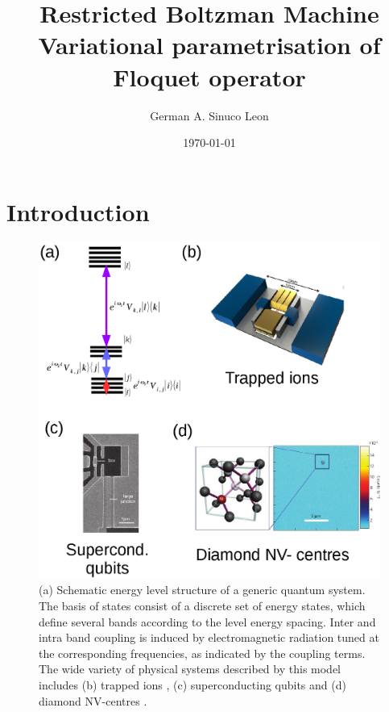 \documentclass[pra,twocolumn,showkeys,preprintnumbers, amsmath,amssymb, aps,A4paper]{revtex4-1}
\begin{document}

\title{Restricted Boltzman Machine Variational parametrisation of Floquet operator}

\author{German A. Sinuco Leon}


\date{\today}
\begin{abstract}

\end{abstract}

 
\maketitle
\section{\label{sec:Introduction} Introduction}

\begin{figure}
\centering
\includegraphics[width=0.8\linewidth]{GeneralDiscreteSystemSketch3.ps}
\caption{\label{fig:SystemSketch} (a) Schematic energy level structure of a generic quantum system. The basis of states consist of a discrete set of energy states, which define several bands according to the level energy spacing. Inter and intra band coupling is induced by electromagnetic radiation tuned at the corresponding frequencies, as indicated by the coupling terms. The wide variety of physical systems described by this model includes (b) trapped ions \cite{PhysRevLett.117.220501}, (c) superconducting qubits \cite{vion2002manipulating} and (d) diamond NV-centres \cite{balasubramanian2009ultralong}.}
\end{figure}
\end{document}
